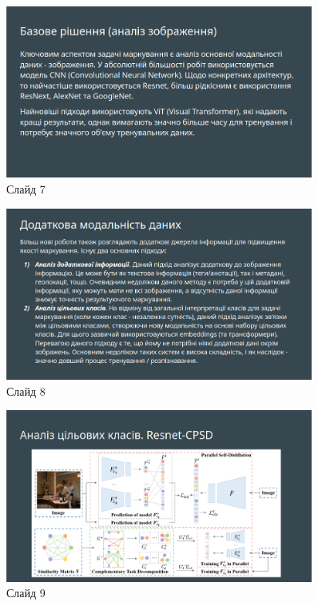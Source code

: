 \documentclass{udstu}
\begin{document}
\begin{figure}[!ht]
	\centering
	\includegraphics[width=0.9\textwidth]{PNG/present/present-7}
	\caption{Слайд 7}
\end{figure}

\begin{figure}[!ht]
	\centering
	\includegraphics[width=0.9\textwidth]{PNG/present/present-8}
	\caption{Слайд 8}
\end{figure}

\begin{figure}[!ht]
	\centering
	\includegraphics[width=0.9\textwidth]{PNG/present/present-9}
	\caption{Слайд 9}
\end{figure}
\end{document}
